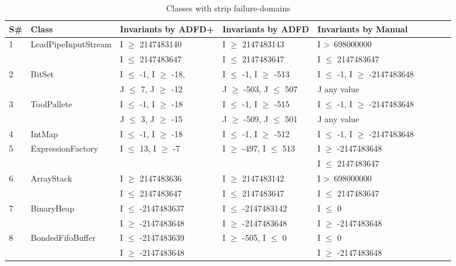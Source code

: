 {\scriptsize
\begin{longtable}{|l|l|l|l|l|l|l|l|l|}
  \caption{Classes with strip failure-domains}\\
  
  \hline
S\#  & Class						& Invariants by ADFD+       		& Invariants by ADFD     			& Invariants by Manual	\\
  \hline
  \endhead
1	&LeadPipeInputStream 		& I $\ge$ 2147483140			& I $\ge$ 2147483143			& I \textgreater~698000000					\\ 
	&                                             & I $\le$ 2147483647	  		& I $\le$ 2147483647 			& I $\le$ 2147483647					\\
2	& BitSet				  		& I $\le$ -1, I $\ge$ -18,			& I $\le$ -1, I $\ge$ -513			& I $\le$ -1, I $\ge$ -2147483648	\\ 
	&                                             & J $\le$ 7, J $\ge$ -12  			& J $\ge$ -503, J $\le$ 507		& J any value									\\ %
3	& ToolPallete			  		& I $\le$ -1, I $\ge$ -18			& I $\le$ -1, I $\ge$ -515			& I $\le$ -1, I $\ge$ -2147483648	\\ 
	&                                             & J $\le$ 3, J $\ge$ -15			& J $\ge$ -509, J $\le$ 501		& J any value			   						\\
4	& IntMap			  		& I $\le$ -1, I $\ge$ -18			& I $\le$ -1, I $\ge$ -512			& I $\le$ -1, I $\ge$ -2147483648	\\
5	& ExpressionFactory	  		& I $\le$ 13, I $\ge$ -7			& I $\ge$ -497, I $\le$ 513		& I $\ge$ -2147483648 				\\ %
	&                                             & 								&								& I $\le$ 2147483647					\\
6	& ArrayStack					& I $\ge$ 2147483636			& I $\ge$ 2147483142			& I \textgreater~698000000 					\\ 
	&                                             & I $\le$ 2147483647 			& I $\le$ 2147483647 			& I $\le$ 2147483647 					\\
7	& BinaryHeap				& I $\le$ -2147483637			& I $\le$ -2147483142			& I $\le$ 0								 \\	
	&                                             & I $\ge$ -2147483648			& I $\ge$ -2147483648			& I $\ge$ -2147483648				\\
8	& BondedFifoBuffer			& I $\le$ -2147483639 			& I $\ge$ -505, I $\le$ 0			& I $\le$ 0 								\\
	&                                             & I $\ge$ -2147483648			& 								& I $\ge$ -2147483648				\\	

\end{longtable}}
